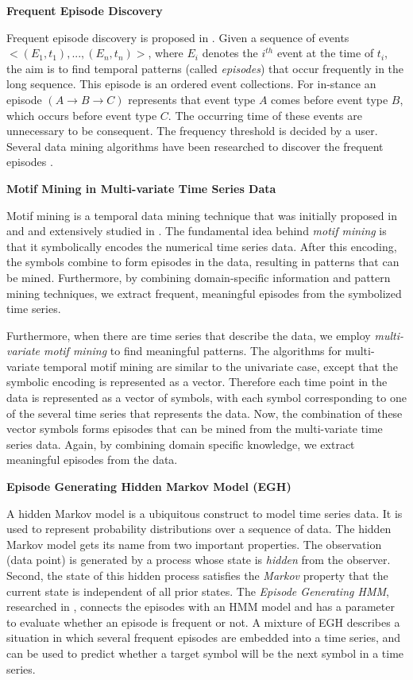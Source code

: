 \textbf{Frequent Episode Discovery}

Frequent episode discovery is proposed in \cite{mannila1997discovery}. 
Given a sequence of events $<(E_1, t_1), ..., (E_n, t_n)>$, 
where $E_i$ denotes the $i^{th}$ event at the time of $t_i$, 
the aim is to find temporal patterns (called \textit{episodes}) that occur 
frequently in the long sequence. 
This episode is an ordered event collections. 
For in-stance an episode $(A\rightarrow B\rightarrow C)$ represents that event type $A$ comes before event type $B$, 
which occurs before event type $C$. 
The occurring time of these events are unnecessary to be consequent. 
The frequency threshold is decided by a user. 
 Several data mining algorithms have been researched to 
 discover the frequent episodes \cite{mannila1997discovery, laxman2005discovering}.
 
\textbf{Motif Mining in Multi-variate Time Series Data}

Motif mining is a temporal data mining technique that was initially proposed in ~\cite{motif1} and \cite{motif2} and extensively studied in \cite{minnen2007improving, tanaka2005discovery, motifgoal}. The fundamental idea behind \emph{motif mining} is that it symbolically encodes the numerical time series data. After this encoding, the symbols combine to form episodes in the data, resulting in patterns that can be mined. Furthermore, by combining domain-specific information and pattern mining techniques, we extract frequent,  meaningful episodes from the symbolized time series.

Furthermore, when there are time series that describe the data, we employ \emph{multi-variate motif mining} to find meaningful patterns. The algorithms for multi-variate temporal motif mining are similar to the univariate case, except that the symbolic encoding is represented as a vector. Therefore each time point in the data is represented as a vector of symbols, with each symbol corresponding to one of the several time series that represents the data. Now, the combination of these vector symbols forms episodes that can be mined from the multi-variate time series data. Again, by combining domain specific knowledge, we extract meaningful episodes from the data.

\textbf{Episode Generating Hidden Markov Model (EGH)} 

A hidden Markov model is a ubiquitous construct to model time series data. It is used to represent probability distributions over a sequence of data. The hidden Markov model gets its name from two important properties. The observation (data point) is generated by a process whose state is \emph{hidden} from the observer. Second, the state of this hidden process satisfies the \emph{Markov} property that the current state is independent of all prior states. The \emph{Episode Generating HMM}, researched in \cite{laxman2005discovering}, connects the episodes with an HMM model and has a parameter to evaluate whether an episode is frequent or not. A mixture of EGH describes a situation in which several frequent episodes are embedded into a time series, and can be used to predict whether a target symbol will be the next symbol in a time series.

